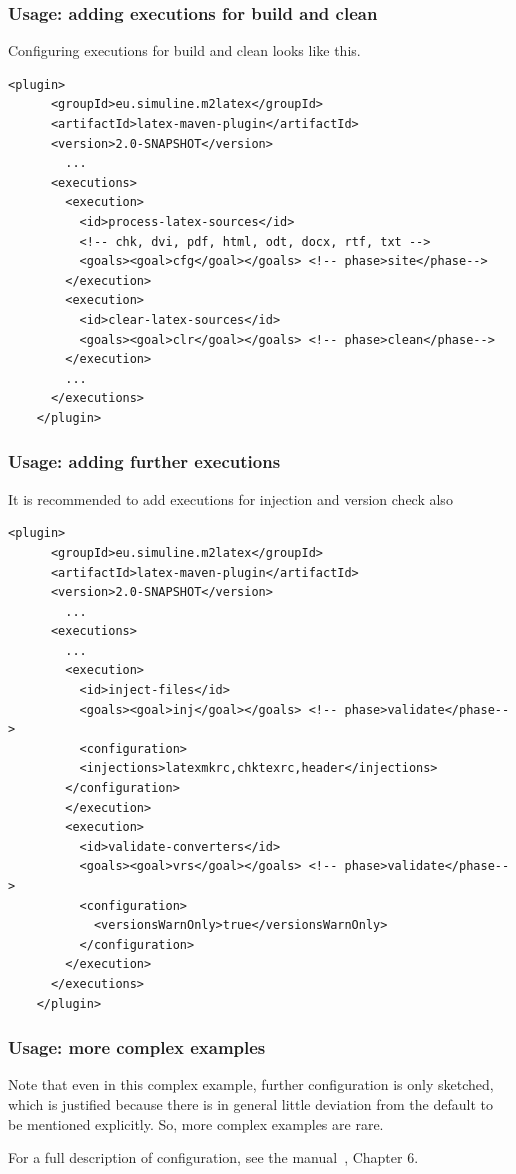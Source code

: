 \begin{frame}[fragile]
  \frametitle{Usage: adding executions for build and clean}
  Configuring executions for build and clean looks like this. 

\begin{Verbatim}[fontsize=\tiny]
    <plugin>
      <groupId>eu.simuline.m2latex</groupId>
      <artifactId>latex-maven-plugin</artifactId>
      <version>2.0-SNAPSHOT</version>
        ...
      <executions>
        <execution>
          <id>process-latex-sources</id>
          <!-- chk, dvi, pdf, html, odt, docx, rtf, txt -->
          <goals><goal>cfg</goal></goals> <!-- phase>site</phase-->
        </execution>
        <execution>
          <id>clear-latex-sources</id>
          <goals><goal>clr</goal></goals> <!-- phase>clean</phase-->
        </execution>
        ...
      </executions>
    </plugin>
\end{Verbatim}

\end{frame}

\begin{frame}[fragile]
  \frametitle{Usage: adding further executions }
  It is recommended to add executions for injection and version check also 

\begin{Verbatim}[fontsize=\tiny]
    <plugin>
      <groupId>eu.simuline.m2latex</groupId>
      <artifactId>latex-maven-plugin</artifactId>
      <version>2.0-SNAPSHOT</version>
        ...
      <executions>
        ...
        <execution>
          <id>inject-files</id>
          <goals><goal>inj</goal></goals> <!-- phase>validate</phase-->
          <configuration>
          <injections>latexmkrc,chktexrc,header</injections>
        </configuration>
        </execution>
        <execution>
          <id>validate-converters</id>
          <goals><goal>vrs</goal></goals> <!-- phase>validate</phase-->
          <configuration>
            <versionsWarnOnly>true</versionsWarnOnly>
          </configuration>
        </execution>
      </executions>
    </plugin>
\end{Verbatim}

\end{frame}


\begin{frame}[fragile]
  \frametitle{Usage: more complex examples}
  Note that even in this complex example, 
  further configuration is only sketched, 
  which is justified because 
  there is in general little deviation from the default 
  to be mentioned explicitly. 
  So, more complex examples are rare. 

  For a full description of configuration, 
see the manual~\cite{LatexPlugin}, Chapter 6. 
\end{frame}

